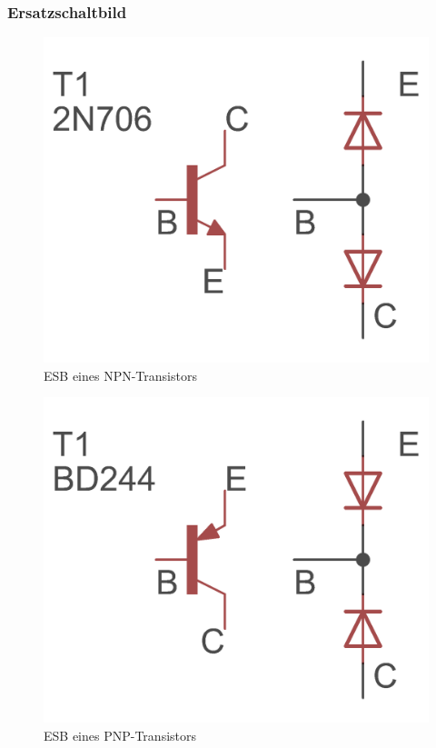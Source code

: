 \begin{frame}
  \frametitle{Ersatzschaltbild}

  \begin{minipage}{0.4\textwidth}
    \begin{figure}
      \includegraphics[width=\textwidth,height=.4\textheight,keepaspectratio]{e13/NPN_esb.png}
      \caption{ESB eines \hbox{NPN-Transistors}}
    \end{figure}
  \end{minipage}
  \hspace{0.5cm}
  \begin{minipage}{0.4\textwidth}
    \begin{figure}
      \includegraphics[width=\textwidth,height=.4\textheight,keepaspectratio]{e13/PNP_esb.png}
      \caption{ESB eines \hbox{PNP-Transistors}}
    \end{figure}
  \end{minipage}


\end{frame}
